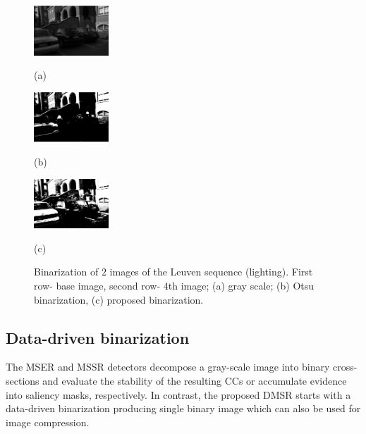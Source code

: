 \documentclass{article}
\begin{document}
\begin{figure}[htb]
\begin{minipage}[b]{.3\linewidth}
  \centering
  \centerline{\includegraphics[width=2.8cm]{./Figs/leuven4}}
   \centerline{(a)}\medskip
\end{minipage}
\hfill
\begin{minipage}[b]{0.3\linewidth}
  \centering
  \centerline{\includegraphics[width=2.8cm]{./Figs/leuven4_otsu}}
   \centerline{(b)}\medskip
\end{minipage}
\hfill
\begin{minipage}[b]{0.3\linewidth}
  \centering
  \centerline{\includegraphics[width=2.8cm]{./Figs/leuven4_numcc}}
   \centerline{(c)}\medskip
\end{minipage}

 \vspace{-0.5cm}
\caption{Binarization of $2$ images of the Leuven sequence (lighting). First row- base image, second row- $4$th image; (a) gray scale; (b) Otsu binarization, (c) proposed binarization.}
\label{fig:leuven_bin}
%
\end{figure}

\subsection{Data-driven binarization}
\label{ssec:binarize}
The MSER and MSSR detectors decompose a gray-scale image into binary cross-sections and evaluate the stability of the resulting CCs or accumulate evidence into saliency masks, respectively. In contrast, the proposed DMSR starts with a data-driven binarization producing single binary image which can also be used for image compression. 
\end{document}
